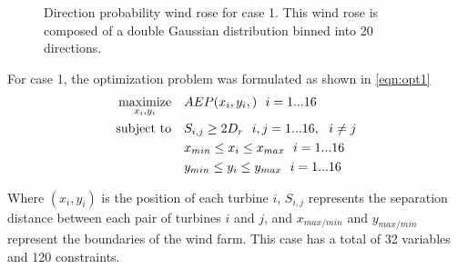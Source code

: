 \documentclass[a4paper]{jpconf}
\begin{document}
\begin{figure}[h!]
\begin{minipage}[t]{18pc}
\caption{Direction probability wind rose for case 1. This wind rose is composed of a double Gaussian distribution binned into 20 directions.}
\label{fig:directional}
\end{minipage} 
\end{figure}
%

For case 1, the optimization problem was formulated as shown in \cref{eqn:opt1}
%
\begin{equation}
	\label{eqn:opt1}
	\begin{aligned} [b]
	\underset{x_i,y_i}{\textrm{maximize}} \quad & AEP(x_i,y_i,)~~i=1...16\\
	\textrm{subject to} \quad & S_{i,j} \geq 2\*D_{r}~~i,j=1...16,~~i \neq j\\
	 & x_{min} \leq x_i \leq x_{max}~~i=1...16\\
     & y_{min} \leq y_i \leq y_{max}~~i=1...16\\
	\end{aligned}
\end{equation}
%
Where $(x_i,y_i)$ is the position of each turbine $i$, $S_{i,j}$ represents the separation distance between each pair of turbines $i$ and $j$, and $x_{max/min}$ and $y_{max/min}$ represent the boundaries of the wind farm. This case has a total of 32 variables and 120 constraints.
\end{document}
